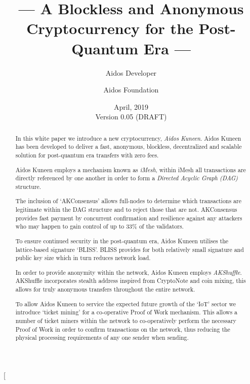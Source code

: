 \documentclass[a4paper,10pt,twocolumn]{article}
\title{--- A Blockless and Anonymous Cryptocurrency for the Post-Quantum Era ---}
\author{
		Aidos Developer \and Aidos Foundation
	}
\date{April, 2019 \\ Version 0.05 (DRAFT)}
\begin{document}
	
	\twocolumn[
		\maketitle
	
	\begin{abstract}
			In this white paper we introduce a new cryptocurrency, \emph{Aidos Kuneen}. Aidos Kuneen has been developed to deliver 
			a fast, anonymous, blockless, decentralized and scalable solution for post-quantum era transfers with zero fees. 
	
	\vspace{2.5mm}
			
			Aidos Kuneen employs a mechanism known as \emph{iMesh}, within iMesh all transactions are directly referenced by
			one another in order to form a \emph{Directed Acyclic Graph (DAG)} structure.
	
	\vspace{2.5mm}
			
			The inclusion of `AKConsensus' allows full-nodes to determine which transactions are legitimate within the DAG structure 
			and to reject those that are not. AKConsensus provides fast payment by concurrent confirmation and resilience against any attackers who may happen to gain 
			control of up to 33\% of the validators.
	
	\vspace{2.5mm}
			
			To ensure continued security in the post-quantum era, Aidos Kuneen utilises the lattice-based signature `BLISS'. BLISS
			provides for both relatively small signature and public key size which in turn reduces network load.
	
	\vspace{2.5mm}
		
			In order to provide anonymity within the network, Aidos Kuneen employs \emph{AKShuffle}. AKShuffle 	
			incorporates stealth address inspired from CryptoNote and coin mixing, this allows for truly anonymous transfers 
			throughout the entire network.
	
	\vspace{2.5mm}
			
			To allow Aidos Kuneen to service the expected future growth of the `IoT' sector we introduce  
			`ticket mining' for a co-operative Proof of Work mechanism. This  allows a number of ticket miners within the network to 
			co-operatively perform the necessary Proof of Work in order to confirm transactions on the network, thus reducing 
			the physical processing requirements of any one sender when sending.
			
			\end{abstract}
	
\end{document}
